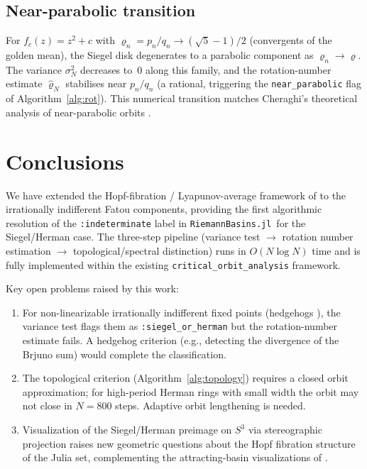 \documentclass[12pt,a4paper]{article}
\newcommand{\Sthree}{S^3}
\newcommand{\rot}{\varrho}    %
\begin{document}
\subsection{Near-parabolic transition}
\label{ssec:ex_parabolic}

For $f_c(z) = z^2 + c$ with $\rot_n = p_n/q_n\to(\sqrt{5}-1)/2$
(convergents of the golden mean), the Siegel disk degenerates to a
parabolic component as $\rot_n\to\rot$.
The variance $\sigma^2_N$ decreases to~$0$ along this family, and the
rotation-number estimate $\hat\rot_N$ stabilises near $p_n/q_n$ (a rational,
triggering the \texttt{near\_parabolic} flag of Algorithm~\ref{alg:rot}).
This numerical transition matches Cheraghi's theoretical analysis of
near-parabolic orbits \cite{Cheraghi2013}.

\section{Conclusions}
\label{sec:conclusions}

We have extended the Hopf-fibration / Lyapunov-average framework of
\cite{Alvarez2023,FatouHopf2026} to the irrationally indifferent Fatou
components, providing the first algorithmic resolution of the
\texttt{:indeterminate} label in \texttt{RiemannBasins.jl}\ for the
Siegel/Herman case.
The three-step pipeline (variance test $\to$ rotation number estimation $\to$
topological/spectral distinction) runs in $O(N\log N)$ time and is fully
implemented within the existing \texttt{critical\_orbit\_analysis} framework.

Key open problems raised by this work:
\begin{enumerate}
  \item For non-linearizable irrationally indifferent fixed points
        (hedgehogs \cite{PerezMarco1992}), the variance test flags them as
        \texttt{:siegel\_or\_herman} but the rotation-number estimate fails.
        A hedgehog criterion (e.g., detecting the divergence of the Brjuno
        sum) would complete the classification.
  \item The topological criterion (Algorithm~\ref{alg:topology}) requires
        a closed orbit approximation; for high-period Herman rings with
        small width the orbit may not close in $N = 800$ steps.
        Adaptive orbit lengthening is needed.
  \item Visualization of the Siegel/Herman preimage on $\Sthree$ via
        stereographic projection raises new geometric questions about
        the Hopf fibration structure of the Julia set, complementing
        the attracting-basin visualizations of \cite{Alvarez2023}.
\end{enumerate}



\end{document}
